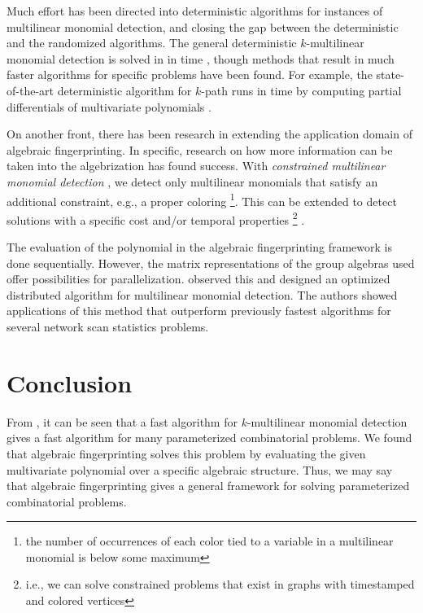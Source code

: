 Much effort \cite{Chen13b, Chen13c, Fomin14, Pratt19, Brand19, Brand21, Brand22}  
has been directed into deterministic algorithms for 
instances of multilinear monomial detection, and 
closing the gap between the deterministic and the randomized algorithms. 
The general deterministic $k$-multilinear monomial detection is solved in
in  time \cite{Fomin14}, though methods that result in 
much faster algorithms for specific problems 
have been found. For example, the state-of-the-art deterministic algorithm for $k$-path 
runs in  time by computing partial differentials of multivariate polynomials \cite{Brand21}.

%
On another front, there has been research in 
extending the application domain of algebraic fingerprinting. 
In specific, 
research on how more information can be taken 
into the algebrization has found success. 
With \emph{constrained multilinear monomial detection} \cite{Koutis12, Björklund16}, 
we detect only multilinear monomials that satisfy an additional constraint, 
e.g., a proper coloring
\footnote{the number of occurrences of each color tied to a variable in a multilinear monomial is below some maximum}. 
This can be extended to detect solutions with a specific cost \cite{Björklund16} 
and/or temporal properties
\footnote{i.e., we can solve constrained problems that exist in graphs with timestamped and colored vertices} 
\cite{Thejaswi20}.

The evaluation of the polynomial in the algebraic fingerprinting framework is done sequentially. 
However, the matrix representations of the group algebras used 
offer possibilities for parallelization. \textcite{Midas19} observed this and designed 
an optimized distributed algorithm for multilinear monomial detection. 
The authors showed applications of this method that outperform previously 
fastest algorithms for several network scan statistics problems.

\section{Conclusion}
\label{sect:conclusion}

From , 
it can be seen  
that a fast algorithm for $k$-multilinear monomial detection gives a 
fast algorithm for many parameterized combinatorial problems. 
We found that algebraic fingerprinting solves this problem by 
evaluating the given multivariate polynomial over a specific algebraic structure. 
Thus, we 
may say that algebraic fingerprinting gives a general framework for solving 
parameterized combinatorial problems. 


